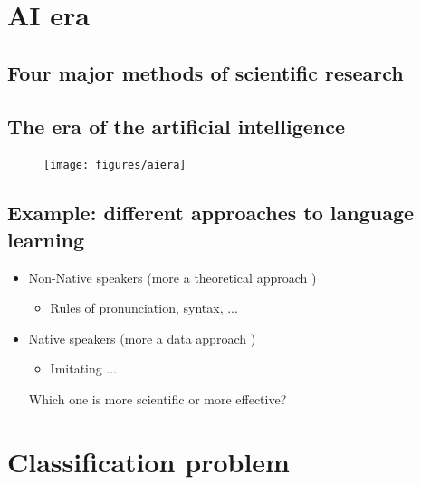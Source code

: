 \section{AI era}
\subsection{Four major methods of scientific research}
\begin{figure}[H]
\centering
{}
\end{figure}





\subsection{The era of the artificial intelligence}
\begin{figure}[H]
\centering
\texttt{[image: figures/aiera]}
\end{figure}


\subsection{Example: different approaches to language learning}
\begin{itemize}
	\item Non-Native speakers (more a theoretical approach )
	\begin{itemize}
	\item Rules of pronunciation,  syntax, ...
	\end{itemize}
    \item Native speakers (more a data approach )
	\begin{itemize}
	\item Imitating ...
	\end{itemize}
Which one is more scientific or more effective?
\end{itemize}



\section{Classification problem }
